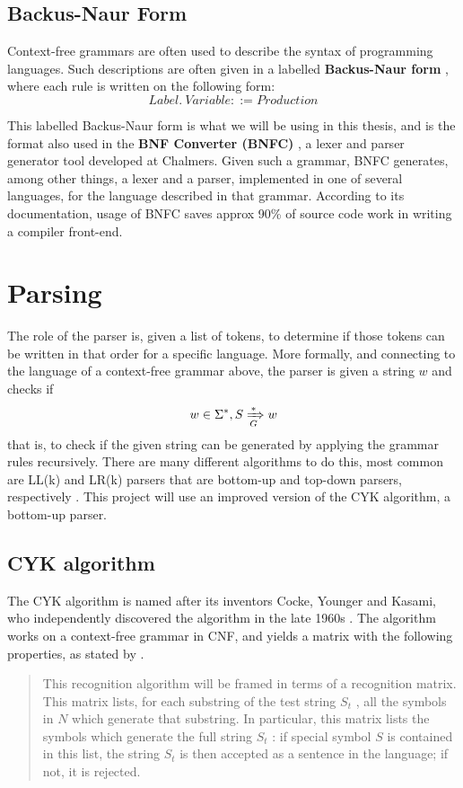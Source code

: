 \documentclass[a4paper,12pt,twosided]{report}
\renewcommand\cite{\citep}
\begin{document}
\subsection{Backus-Naur Form}
Context-free grammars are often used to describe the syntax of programming
languages. Such descriptions are often given in a labelled \textbf{Backus-Naur
form} \cite{backusform}, where each rule is written on the following form:
\[
Label.\ Variable ::= Production 
\]

This labelled Backus-Naur form is what we will be using in this thesis, and is
the format also used in the \textbf{BNF Converter (BNFC)} \cite{bnfc}, a lexer
and parser generator tool developed at Chalmers.  Given such a grammar, BNFC
generates, among other things, a lexer and a parser, implemented in one of
several languages, for the language described in that grammar. According to its
documentation, usage of BNFC saves approx 90\% of source code work in writing a
compiler front-end. 

\section{Parsing}
\label{parsingsection}
The role of the parser is, given a list of tokens, to determine if those tokens
can be written in that order for a specific language. More formally, and
connecting to the language of a context-free grammar above, the parser is given
a string $w$ and checks if 
\[
w \in \Sigma^*, S \xRightarrow[G]{*} w
\]
that is, to check if the given string can be generated by applying the grammar
rules recursively. There are many different algorithms to do this, most common
are LL(k) and LR(k) parsers that are bottom-up and top-down parsers,
respectively \cite[p.192]{dragonbook}. This project will use an improved version
of the CYK algorithm, a bottom-up parser.

\subsection{CYK algorithm}
The CYK algorithm is named after its inventors Cocke, Younger and Kasami, who
independently discovered the algorithm in the late 1960s \cite{Younger67}. The
algorithm works on a context-free grammar in CNF, and yields a matrix with the
following properties, as stated by \citet{Younger67}.

\begin{quote}
This recognition algorithm will be framed in terms of a recognition
matrix. This matrix lists, for each substring of the test string $S_t$ , all
the symbols in $N$ which generate that substring. In particular, this
matrix lists the symbols which generate the full string $S_t$ : if special
symbol $S$ is contained in this list, the string $S_t$ is then accepted as a
sentence in the language; if not, it is rejected.
\end{quote}
\end{document}
